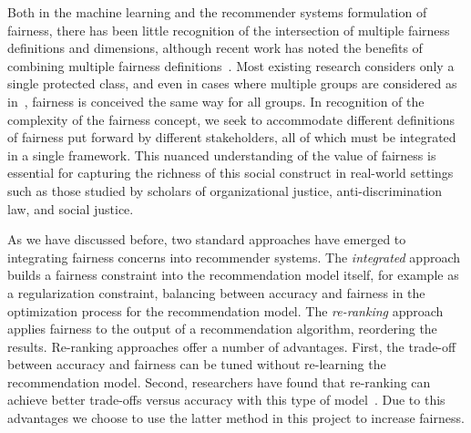 
Both in the machine learning and the recommender systems formulation of fairness, there has been little recognition of the intersection of multiple fairness definitions and dimensions, although recent work has noted the benefits of combining multiple fairness definitions~\cite{beutel2019fairness}. Most existing research considers only a single protected class, and even in cases where multiple groups are considered as in~\cite{buolamwini2018gender,hebert2018multicalibration,kearns2017preventing,zhu2018fairness}, fairness is conceived the same way for all groups. In recognition of the complexity of the fairness concept, we seek to accommodate different definitions of fairness put forward by different stakeholders, all of which must be integrated in a single framework. This nuanced understanding of the value of fairness is essential for capturing the richness of this social construct in real-world settings such as those studied by scholars of organizational justice, anti-discrimination law, and social justice.

As we have discussed before, two standard approaches have emerged to integrating fairness concerns into recommender systems. The \textit{integrated} approach builds a fairness constraint into the recommendation model itself, for example as a regularization constraint, balancing between accuracy and fairness in the optimization process for the recommendation model. The \textit{re-ranking} approach applies fairness to the output of a recommendation algorithm, reordering the results. Re-ranking approaches offer a number of advantages. First, the trade-off between accuracy and fairness can be tuned without re-learning the recommendation model. Second, researchers have found that re-ranking can achieve better trade-offs versus accuracy with this type of model~\cite{abdollahpouri2019managing,liu2019personalized}. Due to this advantages we choose to use the latter method in this project to increase fairness.

